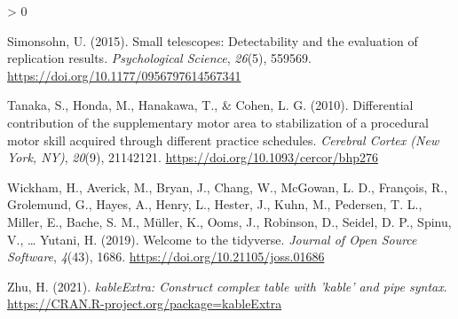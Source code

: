 \documentclass[
  english,
  man,floatsintext]{apa7}
\newlength{\cslhangindent}
\newenvironment{CSLReferences}[2] %
 {%
  \setlength{\parindent}{0pt}
  \ifodd #1 \everypar{\setlength{\hangindent}{\cslhangindent}}\ignorespaces\fi
  \ifnum #2 > 0
  \setlength{\parskip}{#2\baselineskip}
  \fi
 }%
 {}
\begin{document}
\begin{CSLReferences}{1}{0}
\leavevmode\hypertarget{ref-simonsohn2015}{}%
Simonsohn, U. (2015). Small telescopes: Detectability and the evaluation of replication results. \emph{Psychological Science}, \emph{26}(5), 559569. \url{https://doi.org/10.1177/0956797614567341}

\leavevmode\hypertarget{ref-tanaka2010}{}%
Tanaka, S., Honda, M., Hanakawa, T., \& Cohen, L. G. (2010). Differential contribution of the supplementary motor area to stabilization of a procedural motor skill acquired through different practice schedules. \emph{Cerebral Cortex (New York, NY)}, \emph{20}(9), 21142121. \url{https://doi.org/10.1093/cercor/bhp276}

\leavevmode\hypertarget{ref-R-tidyverse}{}%
Wickham, H., Averick, M., Bryan, J., Chang, W., McGowan, L. D., François, R., Grolemund, G., Hayes, A., Henry, L., Hester, J., Kuhn, M., Pedersen, T. L., Miller, E., Bache, S. M., Müller, K., Ooms, J., Robinson, D., Seidel, D. P., Spinu, V., \ldots{} Yutani, H. (2019). Welcome to the {tidyverse}. \emph{Journal of Open Source Software}, \emph{4}(43), 1686. \url{https://doi.org/10.21105/joss.01686}

\leavevmode\hypertarget{ref-R-kableExtra}{}%
Zhu, H. (2021). \emph{kableExtra: Construct complex table with 'kable' and pipe syntax}. \url{https://CRAN.R-project.org/package=kableExtra}

\end{CSLReferences}
\end{document}
